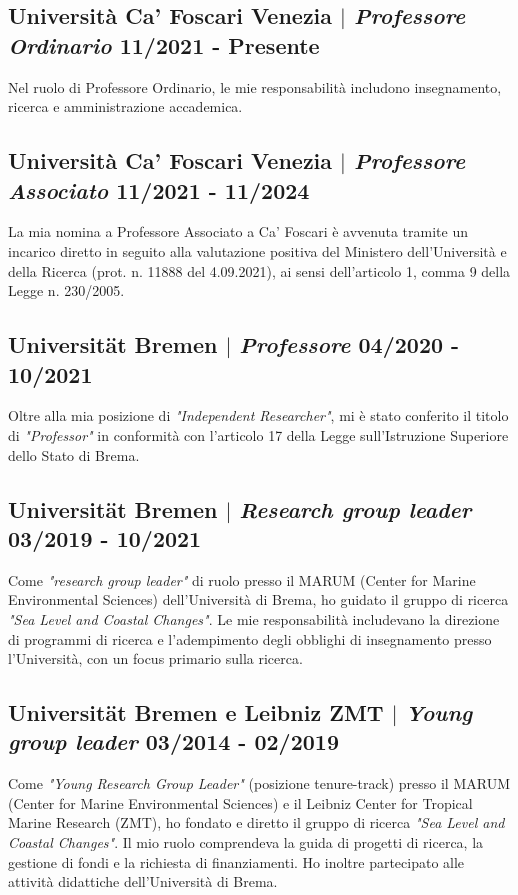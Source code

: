 \documentclass[11pt]{article}
\begin{document}
\bigskip
\subsection{Università Ca' Foscari Venezia $|$ {\normalfont\textit{Professore Ordinario}} \hfill 11/2021 - Presente}
{\footnotesize Nel ruolo di Professore Ordinario, le mie responsabilità includono insegnamento, ricerca e amministrazione accademica.}

\bigskip
\subsection{Università Ca' Foscari Venezia $|$ {\normalfont\textit{Professore Associato}} \hfill 11/2021 - 11/2024}
{\footnotesize La mia nomina a Professore Associato a Ca' Foscari è avvenuta tramite un incarico diretto in seguito alla valutazione positiva del Ministero dell'Università e della Ricerca (prot. n. 11888 del 4.09.2021), ai sensi dell'articolo 1, comma 9 della Legge n. 230/2005.}

\bigskip

\subsection{Universität Bremen $|$ {\normalfont\textit{Professore}} \hfill 04/2020 - 10/2021}
{\footnotesize Oltre alla mia posizione di \textit{"Independent Researcher"}, mi è stato conferito il titolo di \textit{"Professor"} in conformità con l'articolo 17 della Legge sull'Istruzione Superiore dello Stato di Brema.}
\bigskip

\subsection{Universität Bremen $|$ {\normalfont\textit{Research group leader}} \hfill 03/2019 - 10/2021}
{\footnotesize Come \textit{"research group leader"} di ruolo presso il MARUM (Center for Marine Environmental Sciences) dell'Università di Brema, ho guidato il gruppo di ricerca \textit{"Sea Level and Coastal Changes"}. Le mie responsabilità includevano la direzione di programmi di ricerca e l'adempimento degli obblighi di insegnamento presso l'Università, con un focus primario sulla ricerca.}
\bigskip

\subsection{Universität Bremen e Leibniz ZMT $|$ {\normalfont\textit{Young group leader}} \hfill 03/2014 - 02/2019}
{\footnotesize Come \textit{"Young Research Group Leader"} (posizione tenure-track) presso il MARUM (Center for Marine Environmental Sciences) e il Leibniz Center for Tropical Marine Research (ZMT), ho fondato e diretto il gruppo di ricerca \textit{"Sea Level and Coastal Changes"}. Il mio ruolo comprendeva la guida di progetti di ricerca, la gestione di fondi e la richiesta di finanziamenti. Ho inoltre partecipato alle attività didattiche dell'Università di Brema.}
\bigskip
\end{document}
